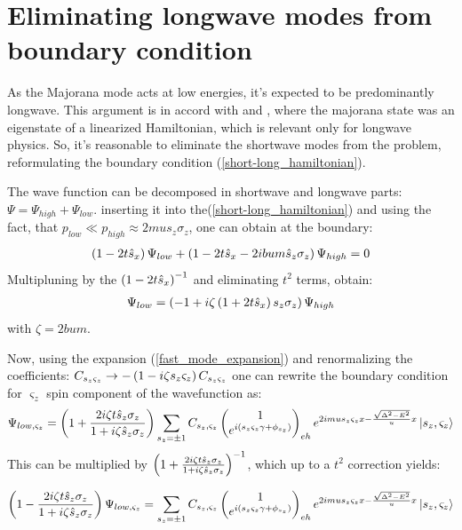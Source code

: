 \section{Eliminating longwave modes from boundary condition}
\label{sec:elimintaing_longwave}
As the Majorana mode acts at low energies, it's expected to be predominantly longwave. This argument is in accord with \cite{Oreg_2010} and \cite{Lutchyn_2010}, where the majorana state was an eigenstate of a linearized Hamiltonian, which is relevant only for longwave physics. So, it's reasonable to eliminate the shortwave modes from the problem, reformulating the boundary condition (\ref{short-long_hamiltonian}).

The wave function can be decomposed in shortwave and  longwave  parts: $ \Psi = \Psi_{high}+\Psi_{low} $. inserting it into the(\ref{short-long_hamiltonian}) and using the fact, that $ p_{low}\ll p_{high} \approx 2mu s_z \sigma_z $, one can obtain at the boundary:
\begin{gather}
	\left(1-2t\hat{s}_x\right)\Psi_{low}+\left(1-2t\hat{s}_x-2ibum\hat{s}_z \sigma_z\right)\Psi_{high}=0
\end{gather}
Multipluning by the $ \left(1-2t\hat{s}_x\right)^{-1} $ and eliminating $ {t^2} $ terms, obtain:
\begin{gather}
	\Psi_{low}
	=
	\left(-1+i\zeta\left(1+2t\hat{s}_x\right)s_z \sigma_z\right)\Psi_{high}
\end{gather}
with $ \zeta=2bum $.

Now, using the expansion (\ref{fast_mode_expansion}) and renormalizing the coefficients: $ C_{s_z \varsigma_z}\to-\left(1-i\zeta s_z \varsigma_z\right)C_{s_z \varsigma_z} $ one can rewrite the boundary condition for $ \varsigma_z $ spin component of the wavefunction as:
\begin{gather}
\Psi_{low,\varsigma_z}
=
\left(1+\frac{2i\zeta t\hat{s}_z\sigma_z}{1+i\zeta \hat{s}_z\sigma_z}\right)
\sum_{s_z=\pm1}
C_{s_z,\varsigma_z}
		\begin{pmatrix}
	1
	\\
	e^{i\left(s_z\varsigma_z\gamma+\phi_{s_z}\right)}
	\end{pmatrix}_{eh}
	e^{2imus_z\varsigma_zx -\frac{\sqrt{\Delta^2-E^2}}{u}x}
	\ket{s_z, \varsigma_z}
\end{gather}
This can be  multiplied by $ \left(1+\frac{2i\zeta t\hat{s}_z\sigma_z}{1+i\zeta \hat{s}_z\sigma_z}\right)^{-1} $, which up to a $ t^2 $ correction yields:

\begin{gather}
\label{bc_projection}
	\left(1-\frac{2i\zeta t\hat{s}_z\sigma_z}{1+i\zeta \hat{s}_z\sigma_z}\right)
	\Psi_{low,\varsigma_z}
	=
	\sum_{s_z=\pm1}
	C_{s_z,\varsigma_z}
			\begin{pmatrix}
	1
	\\
	e^{i\left(s_z\varsigma_z\gamma+\phi_{s_z}\right)}
	\end{pmatrix}_{eh}
	e^{2imus_z\varsigma_zx -\frac{\sqrt{\Delta^2-E^2}}{u}x}
	\ket{s_z, \varsigma_z}
\end{gather}

